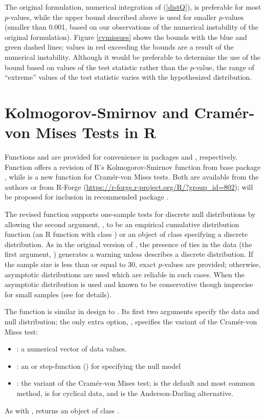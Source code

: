 The original formulation, numerical integration of (\ref{distQ}),
 is preferable for most $p$-values, while
the upper bound described above
is used for smaller $p$-values (smaller than 0.001,
based on our observations of the numerical instability of the original
formulation).  Figure \ref{cvmissues} shows the bounds with the blue and green
dashed lines; values in red exceeding the bounds are a result of the numerical
instability.  Although it would be preferable to determine the use of
the bound based on values of the test statistic rather than the $p$-value,
the range of ``extreme'' values of the test statistic varies with the
hypothesized distribution.

\section{Kolmogorov-Smirnov and Cram\'{e}r-von Mises Tests in R}

Functions  and  are provided for
convenience in packages  and , respectively.
Function  offers a revision of
R's Kolmogorov-Smirnov function  from base
package , while  is a new
function for Cram\'{e}r-von Mises tests.
Both are available from the authors
or from R-Forge (\url{https://r-forge.r-project.org/R/?group_id=802});
 will be proposed for inclusion in recommended
package .

The revised  function supports one-sample tests for discrete
null distributions by allowing the second argument, , to be
an empirical cumulative distribution function (an R function
with class ) or an object of class  specifying
a discrete distribution.  As in the original version of ,
the presence of ties in the data (the first argument, ) generates a
warning unless  describes a discrete distribution.  
If the sample size is less than or equal to 30, exact $p$-values are provided;
otherwise, asymptotic distributions
are used which are reliable in such cases.
When  the asymptotic distribution is used and known
to be conservative though imprecise for small samples (see \cite{Conover1972}
for details).

The function  is similar in design
to .  Its first two
arguments specify the data and null distribution; the only extra option,
, specifies the variant of the Cram\'{e}r-von Mises test:
\begin{itemize}
\item {}: a numerical vector of data values.
\item {}: an  or step-function () for specifying
the null model
\item {}: the variant of the Cram\'{e}r-von Mises test; 
is the default and most common method,  is for cyclical data,
and  is the Anderson-Darling alternative.
\end{itemize}
As with ,  returns an object of class 
.

